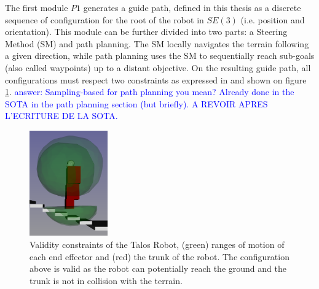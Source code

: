 The first module $P1$ generates a guide path, defined in this thesis as a discrete sequence of configuration for the root of the robot in $SE(3)$ (i.e. position and orientation).
This module can be further divided into two parts: a Steering Method (SM) and path planning. 
The SM locally navigates the terrain following a given direction, while path planning uses the SM to sequentially reach sub-goals (also called waypoints) up to a distant objective. 
On the resulting guide path, all configurations must respect two constraints as expressed in \cite{RB-PRM} and shown on figure \ref{fig:ROMs}.
\textcolor{blue}{answer: Sampling-based for path planning you mean? Already done in the SOTA in the path planning section (but briefly). A REVOIR APRES L'ECRITURE DE LA SOTA.}

\begin{figure}
    \centering
    \includegraphics[width=0.3\textwidth]{Figures/Chapter_LEAS/ROMs.png}
    \caption{Validity constraints of the Talos Robot, (green) ranges of motion of each end effector and (red) the trunk of the robot. The configuration above is valid as the robot can potentially reach the ground and the trunk is not in collision with the terrain.}
    \label{fig:ROMs}
\end{figure}

